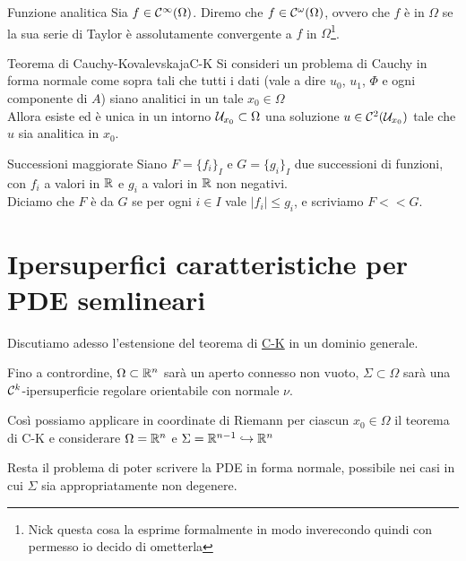 \documentclass{book}
\begin{document}
\begin{definition}{Funzione analitica}{}
    Sia $f \in \mathcal{C}^\infty(\Omega)$. Diremo che $f\in\mathcal{C}^\omega(\Omega)$, ovvero che $f$ è  in $\Omega$ se la sua serie di Taylor è assolutamente convergente a $f$ in $\Omega$\footnote{Nick questa cosa la esprime formalmente in modo inverecondo quindi con permesso io decido di ometterla}.
\end{definition}

\begin{theorem}{Teorema di Cauchy-Kovalevskaja}{C-K}
    Si consideri un problema di Cauchy in forma normale come sopra tali che tutti i dati (vale a dire $u_0$, $u_1$, $\Phi$ e ogni componente di $A$) siano analitici in un tale $x_0 \in \Omega$\\
    Allora esiste ed è unica in un intorno $\mathcal{U}_{x_0} \subset \Omega$ una soluzione $u\in\mathcal{C}^2(\mathcal{U}_{x_0})$ tale che $u$ sia analitica in $x_0$.
\end{theorem}

\begin{definition}{Successioni maggiorate}{}
    Siano $F = \{f_i\}_I$ e $G = \{g_i\}_I$ due successioni di funzioni, con $f_i$ a valori in $\mathbb{R}$ e $g_i$ a valori in $\mathbb{R}$ non negativi.\\
    Diciamo che $F$ è  da $G$ se per ogni $i\in I$ vale $|f_i| \le g_i$, e scriviamo $F<<G$.
\end{definition}

\section{Ipersuperfici caratteristiche per PDE semlineari}

Discutiamo adesso l'estensione del teorema di \href{th:C-K}{C-K} in un dominio generale.

\begin{notation}
    Fino a contrordine, $\Omega \subset \mathbb{R}^n$ sarà un aperto connesso non vuoto, $\Sigma\subset\Omega$ sarà una $\mathcal{C}^k$-ipersuperficie regolare orientabile con normale $\nu$.
\end{notation}

Così possiamo applicare in coordinate di Riemann per ciascun $x_0 \in \Omega$ il teorema di C-K e considerare $\Omega = \mathbb{R}^n$ e $\Sigma = \mathbb{R}^{n-1}\hookrightarrow\mathbb{R}^n$

Resta il problema di poter scrivere la PDE in forma normale, possibile nei casi in cui $\Sigma$ sia appropriatamente non degenere.
\end{document}
